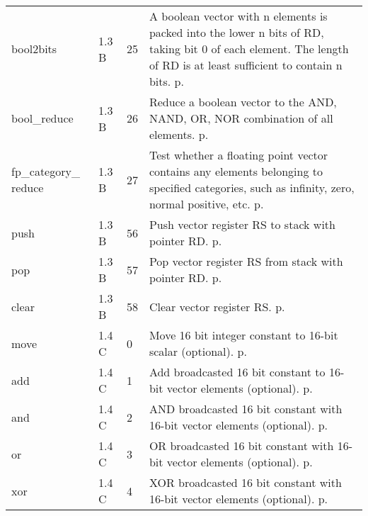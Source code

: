 \documentclass[forwardcom.tex]{subfiles}
\begin{document}
\begin{longtable} {|p{25mm}|p{14mm}|p{10mm}|p{95mm}|}
bool2bits     & 1.3 B & 25 & A boolean vector with n elements is packed into the lower n bits of RD, taking bit 0 of each element. The length of RD is at least sufficient to contain n bits. p. \pageref{table:bool2bitsInstruction} \\

bool\_reduce  & 1.3 B & 26 & Reduce a boolean vector to the AND, NAND, OR, NOR combination of all elements. p. \pageref{table:boolReduceInstruction} \\

fp\_category\_ reduce & 1.3 B & 27 & Test whether a floating point vector contains any elements belonging to specified categories, such as infinity, zero, normal positive, etc. p. \pageref{table:fpCategoryReduceInstruction} \\

push          & 1.3 B & 56  & Push vector register RS to stack with pointer RD. p. \pageref{table:pushInstruction} \\
pop           & 1.3 B & 57  & Pop vector register RS from stack with pointer RD. p. \pageref{table:popInstruction} \\
clear         & 1.3 B & 58  & Clear vector register RS. p. \pageref{table:clearInstruction} \\

move          & 1.4 C &  0 & Move 16 bit integer constant to 16-bit scalar (optional). p. \pageref{table:moveInstruction} \\
add           & 1.4 C &  1 & Add broadcasted 16 bit constant to 16-bit vector elements (optional). p. \pageref{table:addInstruction} \\
and           & 1.4 C &  2 & AND broadcasted 16 bit constant with 16-bit vector elements (optional). p. \pageref{table:andInstruction} \\
or            & 1.4 C &  3 & OR broadcasted 16 bit constant with 16-bit vector elements (optional). p. \pageref{table:orInstruction} \\
xor           & 1.4 C &  4 & XOR broadcasted 16 bit constant with 16-bit vector elements (optional). p. \pageref{table:xorInstruction} \\


\end{longtable}
\end{document}
